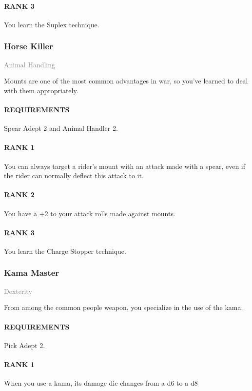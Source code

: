 \paragraph{RANK 3} You learn the Suplex technique.

\subsubsection{Horse Killer} \label{feat::horsekiller}
\small{\textcolor{gray}{Animal Handling}}

\normalsize
Mounts are one of the most common advantages in war, so you've learned to deal with them appropriately.
\paragraph{REQUIREMENTS} Spear Adept 2 and Animal Handler 2.
\paragraph{RANK 1} You can always target a rider's mount with an attack made with a spear, even if the rider can normally deflect this attack to it.
\paragraph{RANK 2} You have a +2 to your attack rolls made against mounts.
\paragraph{RANK 3} You learn the Charge Stopper technique.

\subsubsection{Kama Master} \label{feat::kamamaster}
\small{\textcolor{gray}{Dexterity}}

\normalsize
From among the common people weapon, you specialize in the use of the kama.
\paragraph{REQUIREMENTS} Pick Adept 2.
\paragraph{RANK 1} When you use a kama, its damage die changes from a d6 to a d8
